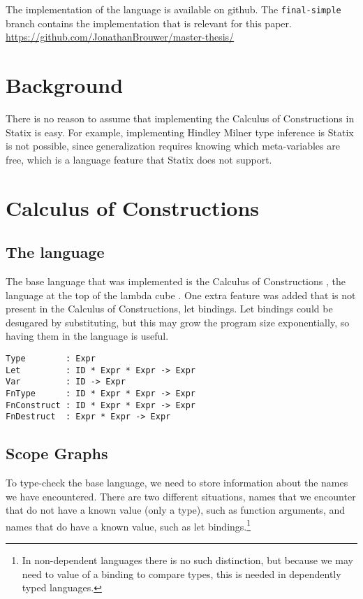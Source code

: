 \documentclass[a4paper,UKenglish,cleveref, autoref, thm-restate]{oasics-v2021}
\begin{document}
The implementation of the language is available on github. The \verb|final-simple| branch contains the implementation that is relevant for this paper. \\
\url{https://github.com/JonathanBrouwer/master-thesis/}

\section{Background}

There is no reason to assume that implementing the Calculus of Constructions in Statix is easy. For example, implementing Hindley Milner type inference is Statix is not possible, since generalization requires knowing which meta-variables are free, which is a language feature that Statix does not support. 

\section{Calculus of Constructions}

\subsection{The language}

The base language that was implemented is the Calculus of Constructions \cite{Coquand_Huet_1988}, the language at the top of the lambda cube \cite{lambda_cube}. One extra feature was added that is not present in the Calculus of Constructions, let bindings. Let bindings could be desugared by substituting, but this may grow the program size exponentially, so having them in the language is useful.

\begin{lstlisting}
Type        : Expr
Let         : ID * Expr * Expr -> Expr
Var         : ID -> Expr
FnType      : ID * Expr * Expr -> Expr
FnConstruct : ID * Expr * Expr -> Expr
FnDestruct  : Expr * Expr -> Expr
\end{lstlisting}

\subsection{Scope Graphs}

To type-check the base language, we need to store information about the names we have encountered. There are two different situations, names that we encounter that do not have a known value (only a type), such as function arguments, and names that do have a known value, such as let bindings.\footnote{In non-dependent languages there is no such distinction, but because we may need to value of a binding to compare types, this is needed in dependently typed languages.}
\end{document}

